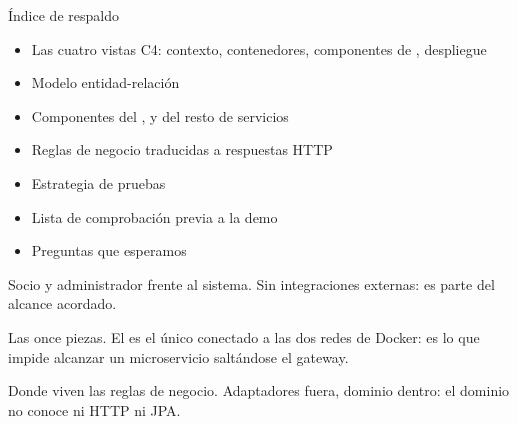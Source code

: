 %
%

\begin{frame}{Índice de respaldo}

  \begin{itemize}\footnotesize
    \item Las cuatro vistas C4: contexto, contenedores, componentes de
          , despliegue
    \item Modelo entidad-relación
    \item Componentes del ,  y del resto de servicios
    \item Reglas de negocio traducidas a respuestas HTTP
    \item Estrategia de pruebas
    \item Lista de comprobación previa a la demo
    \item Preguntas que esperamos
  \end{itemize}
\end{frame}

%
  {Socio y administrador frente al sistema. Sin integraciones externas: es
   parte del alcance acordado.}

%
  {Las once piezas. El  es el único conectado a las dos redes de
   Docker: es lo que impide alcanzar un microservicio saltándose el gateway.}

%
  {Donde viven las reglas de negocio. Adaptadores fuera, dominio dentro: el
   dominio no conoce ni HTTP ni JPA.}

